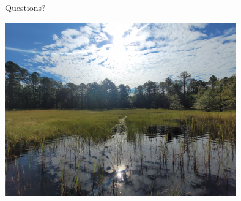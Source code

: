 \documentclass[10pt,aspectratio=169]{beamer}
\begin{document}
\begin{frame}{Questions?}
  \begin{center}
    \includegraphics[height = 7.5cm]{media/conecuh-pond.jpg}    
  \end{center}

\end{frame}
\end{document}
